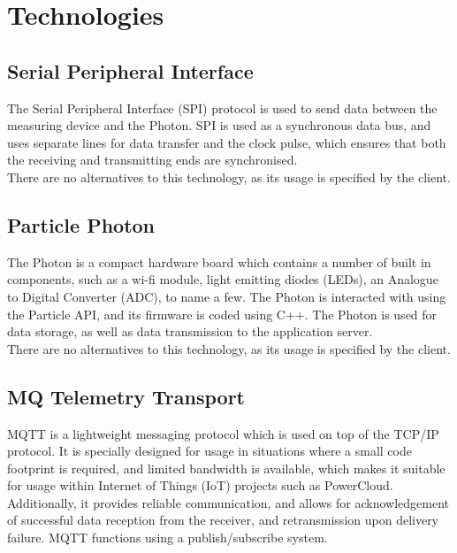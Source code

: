 \documentclass{article}
\begin{document}
\newpage

\section{Technologies}

	\subsection{Serial Peripheral Interface}
	
	The Serial Peripheral Interface (SPI) protocol is used to send data 
	between the measuring device and the Photon. SPI is used as a 
	synchronous data bus, and uses separate lines for data transfer and 
	the clock pulse, which ensures that both the receiving and 
	transmitting ends are synchronised.\\
	
	\noindent
	There are no alternatives to this technology, as its usage is 
	specified by the client.
	
	\subsection{Particle Photon}
	
	The Photon is a compact hardware board which contains a number of 
	built in components, such as a wi-fi module, light emitting diodes 
	(LEDs), an Analogue to Digital Converter (ADC), to name a few. The 
	Photon is interacted with using the Particle API, and its firmware is 
	coded using C++. The Photon is used for data storage, as well as data 
	transmission to the application server.\\
	
	\noindent
	There are no alternatives to this technology, as its usage is 
	specified by the client.
	
	\subsection{MQ Telemetry Transport}
	
	MQTT is a lightweight messaging protocol which is used on top of the 
	TCP/IP protocol. It is specially designed for usage in situations 
	where a small code footprint is required, and limited bandwidth is 
	available, which makes it suitable for usage within Internet of 
	Things (IoT) projects such as PowerCloud. Additionally, it provides 
	reliable communication, and allows for acknowledgement of successful 
	data reception from the receiver, and retransmission upon delivery 
	failure. MQTT functions using a publish/subscribe system.
	
\end{document}
